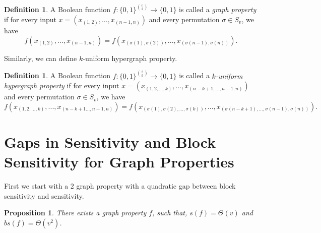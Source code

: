 \documentclass[psamsfonts]{amsart}
\newtheorem{prop}[theorem]{Proposition}
\theoremstyle{definition}
\newtheorem{defn}[theorem]{Definition}
\theoremstyle{remark}
\numberwithin{equation}{section}
\begin{document}
		\begin{defn}
			A Boolean function $f: \{0,1\}^{v \choose{2}} \to \{0,1\}$ is called a \textit{graph property} if for every input $x = (x_{(1,2)},...,x_{(n-1,n)})$ and every permutation $\sigma \in S_v$, we have
			\begin{equation}
				f(x_{(1,2)},...,x_{(n-1,n)}) = f(x_{(\sigma (1), \sigma (2))},...,x_{(\sigma (n-1), \sigma (n))}). \nonumber
			\end{equation}
		\end{defn}
		Similarly, we can define $k$-uniform hypergraph property.
			\begin{defn}
				A Boolean function $f: \{0,1\}^{v \choose{k}} \to \{0,1\}$ is called a \textit{$k$-uniform hypergraph property} if for every input $x = (x_{(1,2,...,k)},...,x_{(n-k+1,...,n-1,n)})$ and every permutation $\sigma \in S_v$, we have
			\begin{equation}
				f(x_{(1,2,...,k)},...,x_{(n-k+1...,n-1,n)}) = f(x_{(\sigma (1), \sigma (2),..., \sigma(k))},...,x_{(\sigma (n-k+1),...,\sigma (n-1), \sigma (n))}). \nonumber
			\end{equation}
			\end{defn}
			
			\section{Gaps in Sensitivity and Block Sensitivity for Graph Properties}
	First we start with a $2$ graph property with a quadratic gap between block sensitivity and sensitivity.

\begin{prop}
There exists a graph property $f$, such that, $s(f) = \Theta(v)$ and $bs(f) = \Theta(v^2)$.
\end{prop} 
\end{document}
